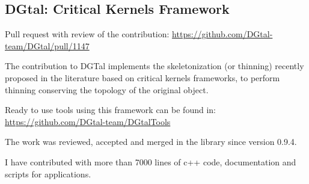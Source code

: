 \subsection{DGtal: Critical Kernels Framework}%
\label{sub:contribution_dgtal}

Pull request with review of the contribution:
\url{https://github.com/DGtal-team/DGtal/pull/1147}

The contribution to DGTal implements the skeletonization (or thinning) recently proposed in the
literature \cite{couprie_3d_2015, bertrand_parallel_2017} based on critical kernels frameworks, to perform thinning conserving the topology of the original object.

Ready to use tools using this framework can be found in:
\url{https://github.com/DGtal-team/DGtalTools}

The work was reviewed, accepted and merged in the library since version 0.9.4.

I have contributed with more than 7000 lines of c++ code, documentation and scripts for applications.



